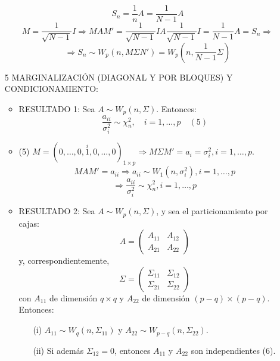 \documentclass[11pt,a4paper]{article}
\begin{document}
\begin{itemize}
$$S_{n} = \frac{1}{n}A = \frac{1}{N-1}A$$
$$M = \frac{1}{\sqrt{N-1}} I \Rightarrow MAM' = \frac{1}{\sqrt{N-1}} I A \frac{1}{\sqrt{N-1}} I = \frac{1}{N-1}A = S_{n} \Rightarrow$$
$$\Rightarrow S_{n} \sim W_{p}(n, M \Sigma N') = W_{p}(n, \frac{1}{N-1}\Sigma)$$

\item[5] MARGINALIZACIÓN (DIAGONAL Y POR BLOQUES) Y CONDICIONAMIENTO:
\begin{itemize}
\item RESULTADO 1: Sea $A \sim W_{p}(n, \Sigma)$. Entonces:
$$\frac{a_{ii}}{\sigma_{i}^{2}} \sim \chi_{n}^{2}, \quad i=1,\dots,p \quad (5)$$

\item (5) $M = (0, \dots, 0, \overset{i}{1}, 0, \dots, 0)_{1 \times p} \Rightarrow M \Sigma M' = a_{i} = \sigma_{i}^{2}, i = 1, \dots, p$.
$$MAM' = a_{ii} \Rightarrow a_{ii} \sim W_{1}(n, \sigma_{i}^{2}), i = 1, \dots, p$$
$$\Rightarrow \frac{a_{ii}}{\sigma_{i}^{2}} \sim \chi_{n}^{2}, i = 1, \dots, p$$

\item RESULTADO 2: Sea $A \sim W_{p}(n, \Sigma)$, y sea el particionamiento por cajas:
$$A = \begin{pmatrix}
A_{11} & A_{12} \\
A_{21} & A_{22}
\end{pmatrix}$$
y, correspondientemente,
$$\Sigma = \begin{pmatrix}
\Sigma_{11} & \Sigma_{12} \\
\Sigma_{21} & \Sigma_{22}
\end{pmatrix}$$
con $A_{11}$ de dimensión $q \times q$ y $A_{22}$ de dimensión $(p-q)\times(p-q)$. Entonces:
\begin{itemize}
\item[(i)] $A_{11} \sim W_{q}(n, \Sigma_{11})$ y $A_{22} \sim W_{p-q}(n, \Sigma_{22})$.
\item[(ii)] Si además $\Sigma_{12} = 0$, entonces $A_{11}$ y $A_{22}$ son independientes (6).
\end{itemize}


\end{itemize}
\end{itemize}
\end{document}
